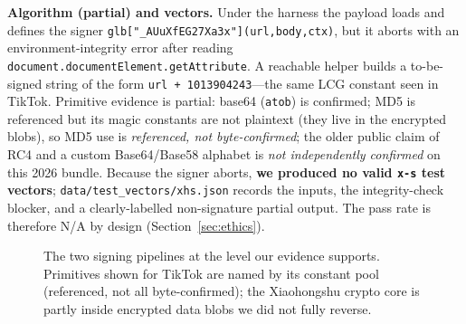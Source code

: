 \documentclass[conference,10pt]{IEEEtran}
\newcommand{\code}[1]{\texttt{\small #1}}
\begin{document}
\textbf{Algorithm (partial) and vectors.} Under the harness the payload loads and defines the signer \code{glb["\_AUuXfEG27Xa3x"](url,body,ctx)}, but it aborts with an environment-integrity error after reading \code{document.documentElement.getAttribute}. A reachable helper builds a to-be-signed string of the form \code{url + 1013904243}---the same LCG constant seen in TikTok. Primitive evidence is partial: base64 (\code{atob}) is confirmed; MD5 is referenced but its magic constants are not plaintext (they live in the encrypted blobs), so MD5 use is \emph{referenced, not byte-confirmed}; the older public claim of RC4 and a custom Base64/Base58 alphabet is \emph{not independently confirmed} on this 2026 bundle. Because the signer aborts, \textbf{we produced no valid \code{x-s} test vectors}; \code{data/test\_vectors/xhs.json} records the inputs, the integrity-check blocker, and a clearly-labelled non-signature partial output. The pass rate is therefore N/A by design (Section~\ref{sec:ethics}).

\begin{figure}[t]
  \centering
  \caption{The two signing pipelines at the level our evidence supports. Primitives shown for TikTok are named by its constant pool (referenced, not all byte-confirmed); the Xiaohongshu crypto core is partly inside encrypted data blobs we did not fully reverse.}
  \label{fig:pipelines}
\end{figure}
\end{document}
